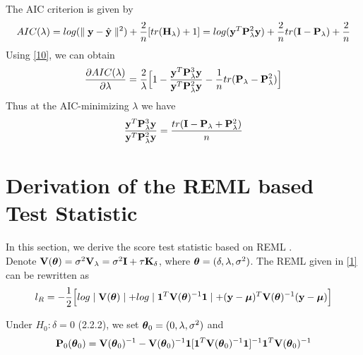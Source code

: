 \documentclass[11pt]{article}
\begin{document}
The AIC criterion is given by
\begin{align*}
AIC(\lambda)=log (\parallel {\bf y}-\hat{{\bf y}}\parallel ^2)+\frac{2}{n}[tr({\bf H}_\lambda)+1]=log({\bf y}^T {\bf P}_\lambda^2{\bf y})+\frac{2}{n}tr({\bf I}-{\bf P}_\lambda)+\frac{2}{n}
\end{align*}
Using \eqref{10}, we can obtain
\begin{align}
\frac{\partial AIC(\lambda)}{\partial \lambda}=\frac{2}{\lambda}\Big[1-\frac{{\bf y}^T {\bf P}_\lambda^3{\bf y}}{{\bf y}^T {\bf P}_\lambda^2{\bf y}}-\frac{1}{n}tr({\bf P}_\lambda-{\bf P}_\lambda^2)\Big]
\end{align}
Thus at the AIC-minimizing $\lambda$ we have
\begin{align*}
\frac{{\bf y}^T {\bf P}_\lambda^3{\bf y}}{{\bf y}^T {\bf P}_\lambda^2{\bf y}}=\frac{tr({\bf I}-{\bf P}_\lambda+{\bf P}_\lambda^2)}{n}
\end{align*}


\setcounter{equation}{0}
\renewcommand{\theequation}{2.\arabic{equation}}
\section{{\bf Derivation of the REML based Test Statistic}}
In this section, we derive the score test statistic based on REML \citep{maity_powerful_2011}.\\ 
Denote ${\bf V}(\boldsymbol{\theta})=\sigma^2 {\bf V}_\lambda=\sigma^2{\bf I}+\tau {\bf K}_\delta$, where $\boldsymbol{\theta}=(\delta, \lambda, \sigma^2)$. The REML given in \eqref{1} can be rewritten as
\begin{align}
l_R=-\frac{1}{2}\Big[log\mid {\bf V}(\boldsymbol{\theta}) \mid +log \mid \mathbf{1}^T{\bf V}(\boldsymbol{\theta})^{-1}\mathbf{1} \mid +({\bf y}-\boldsymbol{\mu})^T{\bf V}(\boldsymbol{\theta})^{-1}({\bf y}-\boldsymbol{\mu})\Big] \label{16}
\end{align}

Under $H_0: \delta=0$ (2.2.2), we set $\boldsymbol{\theta}_0=(0, \lambda, \sigma^2)$ and
\begin{align*}
{\bf P}_0(\boldsymbol{\theta}_0)={\bf V}(\boldsymbol{\theta}_0)^{-1}-{\bf V}(\boldsymbol{\theta}_0)^{-1}\mathbf{1}[\mathbf{1}^T{\bf V}(\boldsymbol{\theta}_0)^{-1}\mathbf{1}]^{-1}\mathbf{1}^T{\bf V}(\boldsymbol{\theta}_0)^{-1}
\end{align*}
\end{document}
